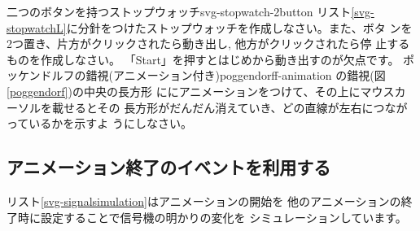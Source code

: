{二つのボタンを持つストップウォッチ}{svg-stopwatch-2button}
{リスト\ref{svg-stopwatchL}に分針をつけたストップウォッチを作成しなさい。また、ボタ
 ンを2つ置き、片方がクリックされたら動き出し, 他方がクリックされたら停
 止するものを作成しなさい。\vspace{-0.5\baselineskip}}
{「Start」を押すとはじめから動き出すのが欠点です。}
{ポッケンドルフの錯視(アニメーション付き)}{poggendorff-animation}
{の錯視(図\ref{poggendorf})の中央の長方形
 ににアニメーションをつけて、その上にマウスカーソルを載せるとその
 長方形がだんだん消えていき、どの直線が左右につながっているかを示すよ
 うにしなさい。\vspace{-1\baselineskip}
}

\subsection{アニメーション終了のイベントを利用する}
リスト\ref{svg-signalsimulation}はアニメーションの開始を
他のアニメーションの終了時に設定することで信号機の明かりの変化を
シミュレーションしています。

